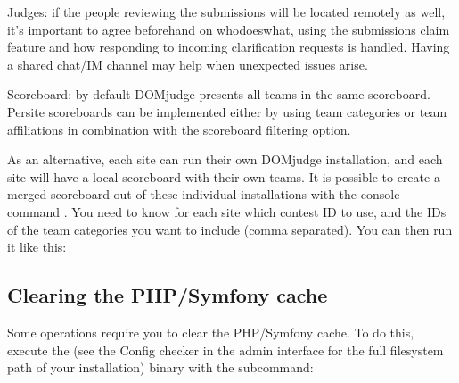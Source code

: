 \documentclass[a4paper,10pt,english,openany]{sphinxmanual}
\begin{document}
\sphinxAtStartPar
Judges: if the people reviewing the submissions will be located remotely as
well, it’s important to agree beforehand on who\sphinxhyphen{}does\sphinxhyphen{}what, using the
submissions claim feature and how responding to incoming clarification requests
is handled. Having a shared chat/IM channel may help when unexpected issues
arise.

\sphinxAtStartPar
Scoreboard: by default DOMjudge presents all teams in the same scoreboard.
Per\sphinxhyphen{}site scoreboards can be implemented either by using team categories or
team affiliations in combination with the scoreboard filtering option.

\sphinxAtStartPar
As an alternative, each site can run their own DOMjudge installation, and
each site will have a local scoreboard with their own teams. It is possible
to create a merged scoreboard out of these individual installations with the
console command . You need to know for each site which
contest ID to use, and the IDs of the team categories you want to include
(comma separated). You can then run it like this:

\begin{sphinxVerbatim}[commandchars=\\\{\}]
   \PYGZbs{}
     \PYGZbs{}
      \PYGZbs{}
    
\end{sphinxVerbatim}


\subsection{Clearing the PHP/Symfony cache}
\label{\detokenize{config-advanced:clearing-the-php-symfony-cache}}\label{\detokenize{config-advanced:clear-cache}}
\sphinxAtStartPar
Some operations require you to clear the PHP/Symfony cache. To do this, execute
the  (see the Config checker in the admin interface for the
full filesystem path of your installation) binary with the  subcommand:
\end{document}
